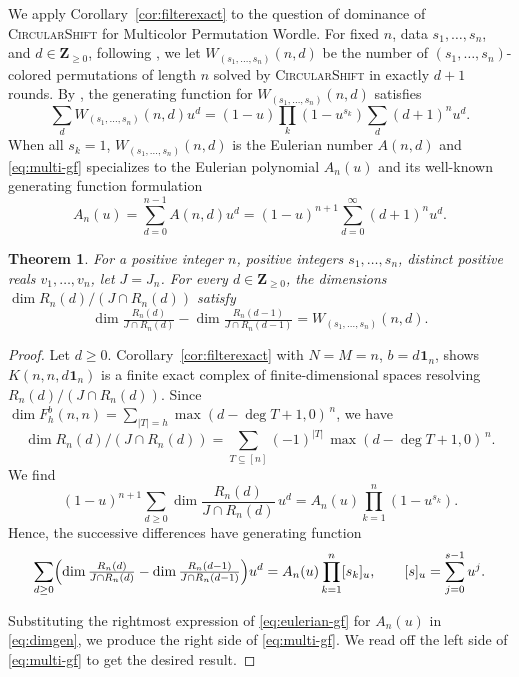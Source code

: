 \documentclass[12pt]{amsart}
\newtheorem{theorem}{Theorem}[section]
\theoremstyle{definition}
\theoremstyle{remark}
\newcommand\rainbow{Multicolor Permutation Wordle\xspace}
\newcommand\basicstrat{\mbox{\textnormal{\textsc{CircularShift}}}\xspace}
\newcommand{\Z}{\mathbf Z}
\newcommand{\One}{\mathbf{1}}
\newcommand{\dOne}[1]{d\mspace{1mu}\One_{#1}}
\newcommand{\Dmult}[1]{{W_{(s_1, \ldots, s_{#1})}}}
\begin{document}
We apply Corollary~\ref{cor:filterexact} to the question of dominance of \basicstrat for \rainbow.
For fixed $n$, data $s_1, \ldots, s_n$, and $d \in \Z_{\geq 0}$,
following \cite{arxiv-kutin-smithline},
we let $\Dmult{n}(n, d)$ be the number of $(s_1, \ldots, s_n)$-colored permutations
of length $n$ solved by \basicstrat in exactly $d+1$ rounds.
By \cite[Theorem~4.7]{arxiv-kutin-smithline}, the generating function for
$\Dmult{n}(n, d)$ satisfies
\begin{equation}\label{eq:multi-gf}
\sum_d \Dmult{n}(n,d) u^d = (1-u)\prod_k(1-u^{s_k}) \sum_d (d+1)^n u^d. 
\end{equation}
When all $s_k = 1$, $\Dmult{n}(n,d)$ is the Eulerian number $A(n,d)$ and \eqref{eq:multi-gf}
specializes to the Eulerian polynomial $A_n(u)$ and its well-known generating function formulation
\begin{equation}\label{eq:eulerian-gf}
  A_n(u) = \sum_{d=0}^{n-1}A(n, d) u^d =
  (1-u)^{n+1}\sum_{d=0}^{\infty} (d+1)^n u^d.
\end{equation}


\begin{theorem}\label{thm:dimcount}
  For a positive integer $n$,
  positive integers $s_1, \ldots, s_n$, distinct positive reals $v_1, \ldots, v_n$,
  let $J = J_n$.  For every $d \in \Z_{\geq 0}$, 
  the dimensions $\dim R_n(d) / (J\cap R_n(d))$
  satisfy
  \[
  \dim\tfrac{R_n(d)}{J\cap R_n(d)}-\dim\tfrac{R_n(d-1)}{J\cap
    R_n(d-1)} =\Dmult{n}(n,d).
    \]
\end{theorem}

\begin{proof}
  Let $d \geq 0$.
  Corollary~\ref{cor:filterexact} with $N=M=n$, $b = \dOne{n}$, shows
  $K(n,n,\dOne{n})$ is a finite exact complex of finite-dimensional spaces resolving
$R_n(d)/(J\cap R_n(d))$. Since
$\dim F^b_h(n,n)=\sum_{|T|=h} \max(d-\deg T+1, 0)^{\,n}$, we have
\[
\dim R_n(d)/(J\cap R_n(d))=
\sum_{T\subseteq[n]}(-1)^{|T|}\,\max(d-\deg T+1, 0)^{\,n}.
\]
We find
\[
(1-u)^{n+1}\sum_{d\ge0}\dim\frac{R_n(d)}{J\cap R_n(d)}\, u^d = A_n(u) \prod_{k=1}^n(1-u^{s_k}).
\]
Hence, the successive differences have generating function
\begin{equation}\label{eq:dimgen}
\sum_{d\ge0}\Bigl(\dim\tfrac{R_n(d)}{J\cap
  R_n(d)}-\dim\tfrac{R_n(d-1)}{J\cap
  R_n(d-1)}\Bigr)u^d=A_n(u)\prod_{k=1}^n [s_k]_u, \qquad [s]_u = \sum_{j=0}^{s-1} u^j.
\end{equation}

Substituting the rightmost expression of \eqref{eq:eulerian-gf}
for $A_n(u)$ in \eqref{eq:dimgen}, we produce the right side of
\eqref{eq:multi-gf}.  We read off the left side of
\eqref{eq:multi-gf} to get the desired result.
\end{proof}
\end{document}
